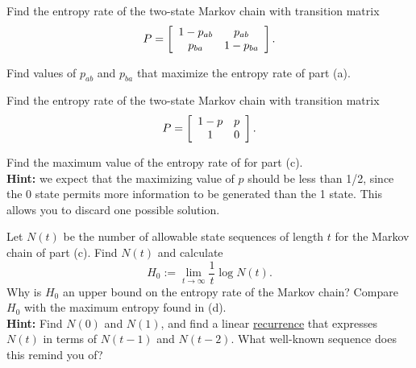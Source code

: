 \documentclass[a4paper,10pt,landscape,twocolumn]{scrartcl}
\begin{document}
\begin{exercise}
	\begin{subex}[(2pt)]
	Find the entropy rate of the two-state Markov chain with transition matrix
	\[
	P = \left[
	\begin{array}{c c}
	1-p_{ab} & p_{ab}\\
	p_{ba} & 1 - p_{ba}
	\end{array}
	\right].
	\]
	\end{subex}
	\begin{subex}[(1pt)]
	Find values of $p_{ab}$ and $p_{ba}$ that maximize the entropy rate of part (a).
	\end{subex}
	\begin{subex}[(1pt)]
	Find the entropy rate of the two-state Markov chain with transition matrix
	\[
	P = \left[
	\begin{array}{c c}
	1-p & p\\
	1 & 0
	\end{array}
	\right].
	\]
	\end{subex}
	\begin{subex}[(2pt)]
	Find the maximum value of the entropy rate of for part (c). \\\textbf{Hint:} we expect that the maximizing value of $p$ should be less than 1/2, since the 0 state permits more information to be generated than the 1 state. This allows you to discard one possible solution.
	\end{subex}
	\begin{subex}[(4pt)]
	Let $N(t)$ be the number of allowable state sequences of length $t$ for the Markov chain of part (c). Find $N(t)$ and calculate
	\[
	H_0 := \lim_{t \to \infty} \frac{1}{t} \log N(t).
	\]
	Why is $H_0$ an upper bound on the entropy rate of the Markov chain? Compare $H_0$ with the maximum entropy found in (d).
	\\\textbf{Hint:} Find $N(0)$ and $N(1)$, and find a linear \href{https://en.wikipedia.org/wiki/Recurrence_relation}{recurrence} that expresses $N(t)$ in terms of $N(t-1)$ and $N(t-2)$. What well-known sequence does this remind you of?
	\end{subex}
\end{exercise}
\end{document}

